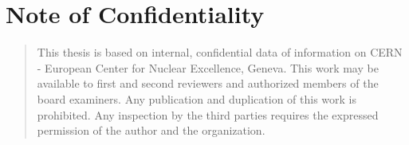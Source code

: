 %
%
%
%
%
%
\chapter*{Note of Confidentiality}
\begin{SingleSpace}
\begin{quote}
This thesis is based on internal, confidential data of information on CERN - European Center for Nuclear Excellence, Geneva.
This work may be available to first and second reviewers and authorized members of the board examiners.
Any publication and duplication of this work is prohibited. Any inspection by the third parties requires the expressed permission of the author and the organization.


\vspace{1.5cm}
\noindent
\end{quote}
\end{SingleSpace}
\clearpage